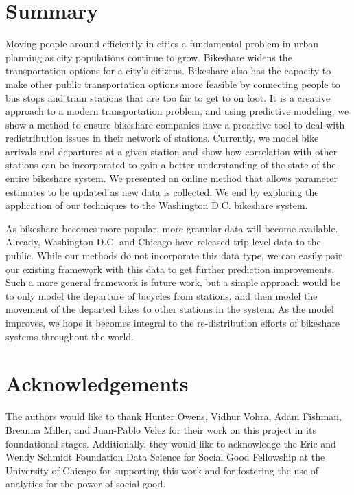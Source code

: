 \documentclass{acm_proc_article-sp}
\begin{document}
\section{Summary}
Moving people around efficiently in cities a fundamental problem in urban planning as city populations continue to grow. Bikeshare widens the transportation options for a city's citizens. Bikeshare also has the capacity to make other public transportation options more feasible by connecting people to bus stops and train stations that are too far to get to on foot. It is a creative approach to a modern transportation problem, and using predictive modeling, we show a method to ensure bikeshare companies have a proactive tool to deal with redistribution issues in their network of stations. Currently, we model bike arrivals and departures at a given station and show how correlation with other stations can be incorporated to gain a better understanding of the state of the entire bikeshare system. We presented an online method that allows parameter estimates to be updated as new data is collected.  We end by exploring the application of our techniques to the Washington D.C. bikeshare system.  

As bikeshare becomes more popular, more granular data will become available.  Already, Washington D.C. and Chicago have released trip level data to the public.  While our methods do not incorporate this data type, we can easily pair our existing framework with this data to get further prediction improvements.  Such a more general framework is future work, but a simple approach would be to only model the departure of bicycles from stations, and then model the movement of the departed bikes to other stations in the system.  As the model improves, we hope it becomes integral to the re-distribution efforts of bikeshare systems throughout the world.

\section{Acknowledgements}
The authors would like to thank Hunter Owens, Vidhur Vohra, Adam Fishman, Breanna Miller, and Juan-Pablo Velez for their work on this project in its foundational stages. Additionally, they would like to acknowledge the Eric and Wendy Schmidt Foundation Data Science for Social Good Fellowship at the University of Chicago for supporting this work and for fostering the use of analytics for the power of social good.



\end{document}
